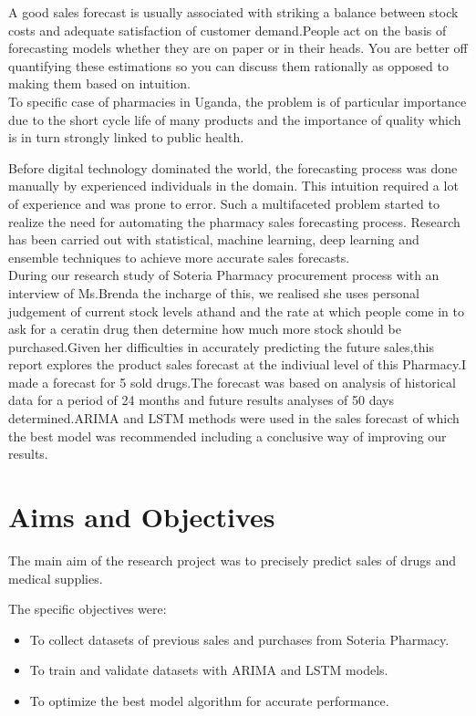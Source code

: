 \documentclass[12pt]{report}
\begin{document}
A good sales forecast is usually associated with striking a balance between stock costs and adequate satisfaction of customer demand.People act on the basis of forecasting models whether they are on paper or in their heads. You are better off quantifying these estimations so you can discuss them rationally as opposed to making them based on intuition.\\

To specific case of pharmacies in Uganda, the problem is of particular importance due to the short cycle life of many products and the importance of quality which is in turn strongly linked to public health.

Before digital technology dominated the world, the forecasting process was done manually by experienced individuals in the domain. This intuition required a lot of experience and was prone to error. Such a multifaceted problem started to realize the need for automating the pharmacy sales forecasting process. Research has been carried out with statistical, machine learning, deep learning and ensemble techniques to achieve more accurate sales forecasts. \cite{Perera2019}\\

During our research study of Soteria Pharmacy procurement process with an interview of Ms.Brenda the incharge of this, we realised she uses personal judgement of current stock levels athand and the rate at which people come in to ask for a ceratin drug then determine how much more stock should be purchased.Given her difficulties in accurately predicting the future sales,this report explores the product sales forecast at the indiviual level of this Pharmacy.I made a forecast for 5 sold drugs.The forecast was based on analysis of  historical data for a period of 24 months and future results analyses of 50 days determined.ARIMA and LSTM methods were used in the sales forecast of which the best model was recommended including a conclusive way of improving our results.
\section{Aims and Objectives}

The main aim of the research project was to precisely predict sales of drugs and medical supplies.

The specific objectives  were:

\begin{itemize}[topsep=0pt]

\item To collect datasets of previous sales and purchases from Soteria Pharmacy.

\item To train and validate datasets with ARIMA and LSTM models.

\item To optimize the best model algorithm for accurate performance.

\end{itemize}
\end{document}
